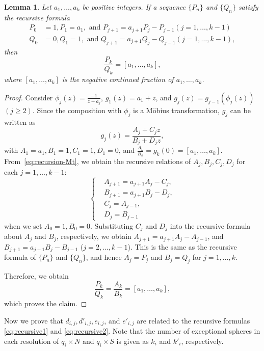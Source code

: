 \documentclass[10pt,a4paper,reqno]{amsart}
\newtheorem{lem}[thm]{Lemma}
\theoremstyle{definition}
\numberwithin{equation}{section}
\numberwithin{figure}{section}
\begin{document}

\begin{lem} \label{lem:recursive}
Let $a_1,\dots , a_k$ be positive integers.
If a sequence $\{P_n\}$ and $\{Q_n\}$ satisfy the recursive formula
\begin{align} 
P_0&=1, P_1=a_1, \text{ and } P_{j+1}=a_{j+1}P_j-P_{j-1}  (j=1,\dots, k-1)  \label{eq:recursive1}\\
Q_0&=0, Q_1=1, \text{ and } Q_{j+1}=a_{j+1}Q_j-Q_{j-1}  (j=1,\dots, k-1) \label{eq:recursive2},
\end{align}
then \[\frac{P_k}{Q_k}=[a_1,\dots, a_k],\]
where $[a_1,\dots, a_k]$ is the negative continued fraction of $a_1,\dots, a_k$.
\end{lem}

\begin{proof}
Consider $\phi_j(z)=\frac{-1}{z+a_j}$, $g_1(z)=a_1+z$, and $g_j(z)=g_{j-1}(\phi_j(z))$ $(j\ge2)$.
Since the composition with $\phi_j$ is a M\"{o}bius transformation, 
$g_j$ can be written as 
\begin{equation}\label{eq:recursion-Mt}
g_j(z)=\frac{A_j+C_j z}{B_j+D_j z},
\end{equation}
with $A_1=a_1, B_1=1, C_1=1, D_1=0$, and $\frac{A_k}{B_k}=g_k(0)=\left[a_1,\dots, a_k\right]$.
From~\eqref{eq:recursion-Mt}, we obtain the recursive relations of $A_j, B_j, C_j, D_j$ for each $j=1,\dots, k-1$:
\begin{equation}
\begin{cases}
&A_{j+1}=a_{j+1} A_{j}-C_{j},\\
&B_{j+1}=a_{j+1} B_{j}-D_{j},\\
&C_{j}=A_{j-1},\\
&D_{j}=B_{j-1}
\end{cases}
\end{equation}
when we set $A_0=1, B_0=0$.
Substituting $C_j$ and $D_j$ into the recursive formula about $A_j$ and $B_j$, respectively, 
we obtain $A_{j+1}=a_{j+1} A_{j}-A_{j-1}$, and $B_{j+1}=a_{j+1} B_{j}-B_{j-1}$ ($j=2,\dots, k-1$).
This is the same as the recursive formula of $\{P_n\}$ and $\{Q_n\}$,
and hence $A_j=P_j$ and $B_j=Q_j$ for $j=1,\dots, k$.

Therefore, we obtain 
\[\frac{P_k}{Q_k}=\frac{A_k}{B_k}=[a_1,\dots, a_k],\]
which proves the claim.
\end{proof}

Now we prove that $d_{i,j}, d'_{i,j}, e_{i,j}$, and $e'_{i,j}$ are related to the recursive formulas \eqref{eq:recursive1} and \eqref{eq:recursive2}.
Note that the number of exceptional spheres in each resolution of $q_i \times N$ and $q_i \times S$ is given as $k_i$ and $k'_i$, respectively.
\end{document}
